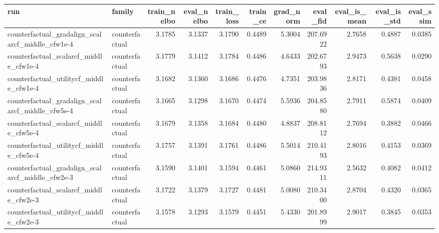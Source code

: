 \begin{tabular}{llrrrrrrrrr}
\toprule
run & family & train_nelbo & eval_nelbo & train_loss & train_ce & grad_norm & eval_fid & eval_is_mean & eval_is_std & eval_ssim \\
\midrule
counterfactual_gradalign_scalarcf_middle_cfw1e-4 & counterfactual & 3.1785 & 3.1337 & 3.1790 & 0.4489 & 5.3004 & 207.6922 & 2.7658 & 0.4887 & 0.0385 \\
counterfactual_scalarcf_middle_cfw1e-4 & counterfactual & 3.1779 & 3.1412 & 3.1784 & 0.4486 & 4.6433 & 202.6793 & 2.9473 & 0.5638 & 0.0290 \\
counterfactual_utilitycf_middle_cfw1e-4 & counterfactual & 3.1682 & 3.1360 & 3.1686 & 0.4476 & 4.7351 & 203.9836 & 2.8171 & 0.4381 & 0.0458 \\
counterfactual_gradalign_scalarcf_middle_cfw5e-4 & counterfactual & 3.1665 & 3.1298 & 3.1670 & 0.4474 & 5.5936 & 204.8580 & 2.7911 & 0.5874 & 0.0409 \\
counterfactual_scalarcf_middle_cfw5e-4 & counterfactual & 3.1679 & 3.1358 & 3.1684 & 0.4480 & 4.8837 & 208.8112 & 2.7694 & 0.3882 & 0.0466 \\
counterfactual_utilitycf_middle_cfw5e-4 & counterfactual & 3.1757 & 3.1391 & 3.1761 & 0.4486 & 5.5014 & 210.4193 & 2.8016 & 0.4153 & 0.0369 \\
counterfactual_gradalign_scalarcf_middle_cfw2e-3 & counterfactual & 3.1590 & 3.1401 & 3.1594 & 0.4461 & 5.0860 & 214.9311 & 2.5632 & 0.4082 & 0.0412 \\
counterfactual_scalarcf_middle_cfw2e-3 & counterfactual & 3.1722 & 3.1379 & 3.1727 & 0.4481 & 5.0080 & 210.3400 & 2.8704 & 0.4320 & 0.0365 \\
counterfactual_utilitycf_middle_cfw2e-3 & counterfactual & 3.1578 & 3.1293 & 3.1579 & 0.4451 & 5.4330 & 201.8999 & 2.9017 & 0.3845 & 0.0353 \\
\bottomrule
\end{tabular}
